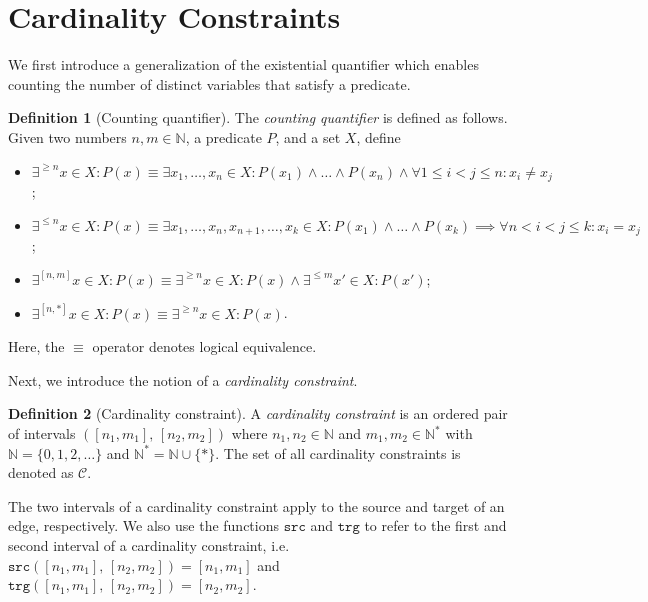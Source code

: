 \documentclass{report}
\theoremstyle{definition}
\newtheorem{definition}{Definition}
\newcommand{\N}{\mathbb{N}}
\newcommand{\src}{\mathtt{src}}
\newcommand{\trg}{\mathtt{trg}}
\begin{document}
\section{Cardinality Constraints}
\label{sec:cardinality}

We first introduce a generalization of the existential quantifier which enables counting the number of distinct variables that satisfy a predicate.

\begin{definition}[Counting quantifier]
  The \emph{counting quantifier} is defined as follows. Given two numbers $n, m \in \N$, a predicate $P$, and a set $X$, define
  \begin{itemize}
    \item $\exists^{\geq n} x \in X : P(x) \equiv \exists x_1, \ldots, x_n \in X : P(x_1) \wedge \ldots \wedge P(x_n) \wedge \forall 1 \leq i < j \leq n : x_i \neq x_j$;
    \item $\exists^{\leq n} x \in X : P(x) \equiv \exists x_1, \ldots, x_n, x_{n+1}, \ldots, x_k \in X : P(x_1) \wedge \ldots \wedge P(x_k) \implies \forall n < i < j \leq k : x_i = x_j$;
    \item $\exists^{[n, m]} x \in X : P(x) \equiv \exists^{\geq n} x \in X : P(x) \wedge \exists^{\leq m} x' \in X : P(x')$;
    \item $\exists^{[n, *]} x \in X : P(x) \equiv \exists^{\geq n} x \in X : P(x)$.
  \end{itemize}

  Here, the $\equiv$ operator denotes logical equivalence.
\end{definition}

Next, we introduce the notion of a \emph{cardinality constraint}.

\begin{definition}[Cardinality constraint]
  \label{def:cardinality-constraint}
  A \emph{cardinality constraint} is an ordered pair of intervals $([n_1, m_1], \, [n_2, m_2])$ where $n_1, n_2 \in \N$ and $m_1, m_2 \in \N^*$ with $\N = \{0, 1, 2, \ldots\}$ and $\N^* = \N \cup \{*\}$. The set of all cardinality constraints is denoted as $\mathcal{C}$.
\end{definition}

The two intervals of a cardinality constraint apply to the source and target of an edge, respectively. We also use the functions $\src$ and $\trg$ to refer to the first and second interval of a cardinality constraint, i.e. $\src([n_1, m_1], \, [n_2, m_2]) = [n_1, m_1]$ and $\trg([n_1, m_1], \, [n_2, m_2]) = [n_2, m_2]$.
\end{document}
